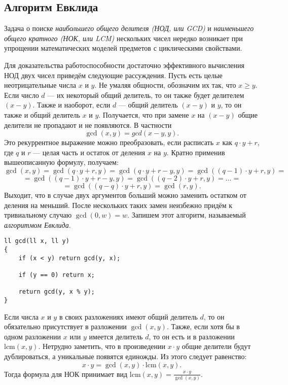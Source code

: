 \subsection{Алгоритм Евклида}


Задача о поиске \emph{наибольшего общего делителя (НОД, или GCD)} и \emph{наименьшего общего кратного (НОК, или LCM)} нескольких чисел нередко возникает при упрощении математических моделей предметов с циклическими свойствами. 

Для доказательства работоспособности достаточно эффективного вычисления НОД двух чисел приведём следующие рассуждения. 
Пусть есть целые неотрицательные числа $x$ и $y$. Не умаляя общности, обозначим их так, что $x \ge y$. Если число $d$ --- их некоторый общий делитель, то он также будет делителем $(x - y)$. Также и наоборот, если $d$ --- общий делитель $(x - y)$ и $y$, то он также и общий делитель $x$ и $y$. Получается, что при замене $x$ на $(x - y)$ общие делители не пропадают и не появляются. В частности \[\gcd(x, y) = gcd(x - y, y).\]
Это рекуррентное выражение можно преобразовать, если расписать $x$ как $q \cdot y + r$, где $q$ и $r$ --- целая часть и остаток от деления $x$ на $y$. Кратно применив вышеописанную формулу, получаем:
\[\gcd(x, y) = \gcd(q \cdot y + r, y) = \gcd(q \cdot y + r - y, y) = \gcd((q-1) \cdot y + r, y) =\]\[= \gcd((q-1) \cdot y + r - y, y) = \gcd((q-2) \cdot y + r, y) = \dots =\]\[= \gcd((q-q) \cdot y + r, y) = \gcd(r, y).\]
Выходит, что в случае двух аргументов больший можно заменить остатком от деления на меньший. После нескольких таких замен неизбежно придём к тривиальному случаю $\gcd(0, w) = w$. Запишем этот алгоритм, называемый \emph{алгоритмом Евклида}.
\begin{lstlisting}
ll gcd(ll x, ll y)
{
    if (x < y) return gcd(y, x);

    if (y == 0) return x;

    return gcd(y, x % y);
}
\end{lstlisting}

Если числа $x$ и $y$ в своих разложениях имеют общий делитель $d$, то он обязательно присутствует в разложении $\gcd(x, y)$. Также, если хотя бы в одном разложении $x$ или $y$ имеется делитель $d$, то он есть и в разложении $\text{lcm}(x, y)$. Нетрудно заметить, что в произведении $x \cdot y$ общие делители будут дублироваться, а уникальные появятся единожды. Из этого следует равенство:
\[x \cdot y = \gcd(x, y) \cdot \text{lcm}(x, y).\]
Тогда формула для НОК принимает вид \(\text{lcm}(x, y) = \frac{x \cdot y}{\gcd(x, y)}\).